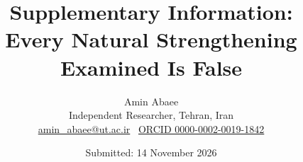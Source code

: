 \documentclass[11pt,a4paper]{article}
\begin{document}
\title{Supplementary Information:\\[4pt] Every Natural Strengthening Examined Is False}
\author{Amin Abaee\\[2pt] {\small Independent Researcher, Tehran, Iran}\\[1pt] {\small \href{mailto:amin_abaee@ut.ac.ir}{amin\_abaee@ut.ac.ir} \textbullet\ \href{https://orcid.org/0000-0002-0019-1842}{ORCID 0000-0002-0019-1842}}}
\date{Submitted: 14 November 2026}\maketitle
\tableofcontents\clearpage



\end{document}
